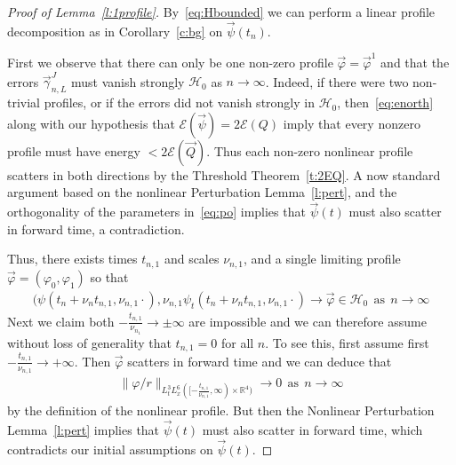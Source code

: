 \documentclass[10pt,reqno]{amsart}
\newcommand{\E}{\mathcal{E}}
\newcommand{\HH}{\mathcal{H}}
\newcommand{\R}{\mathbb{R}}
\newcommand{\fy}{\varphi}
\newcommand{\EQ}[1]{\begin{equation}\begin{split} #1 \end{split}\end{equation}}
\numberwithin{equation}{section}
\theoremstyle{remark}
\newcommand{\mas}{{\ \ \text{as} \ \ }}
\newcommand{\0}{\emptyset}
\begin{document}
\begin{proof}[Proof of Lemma~\ref{l:1profile}]
By~\eqref{eq:Hbounded} we can perform a linear profile decomposition as in Corollary~\ref{c:bg} on $\vec \psi(t_n)$. 

First we observe that there can only be one non-zero profile $\vec \fy = \vec\fy^1$ and that the errors $\vec \gamma_{n, L}^J$ must vanish strongly $\HH_0$ as $n \to \infty$. Indeed, if there were two non-trivial profiles, or if the errors did not vanish strongly in $\HH_0$, then~\eqref{eq:enorth} along with our hypothesis that $\E(\vec \psi) = 2 \E(Q)$  imply that every nonzero profile must have energy $< 2\E(\vec Q)$. Thus each non-zero nonlinear profile scatters in both directions by the Threshold Theorem~\ref{t:2EQ}. A now standard argument based on the nonlinear Perturbation Lemma~\ref{l:pert}, and the orthogonality of the parameters in~\eqref{eq:po} implies that $\vec \psi(t)$ must also scatter in forward time, a contradiction. 


Thus,  there exists times $t_{n, 1}$ and scales $\nu_{n, 1}$, and a single limiting profile $\vec \fy = (\fy_0, \fy_1)$ so that 
\EQ{ \label{eq:psim0} 
( \psi( t_n + \nu_n t_{n, 1}, \nu_{n, 1} \cdot ),   \nu_{n, 1}\psi_t( t_n + \nu_n t_{n, 1}, \nu_{n, 1} \cdot  ) \to  \vec \fy \in \HH_0 \mas n \to \infty
}
Next we claim both $-\frac{t_{n, 1}}{\nu_{n_1}} \to \pm \infty$ are impossible and we can therefore assume without loss of generality that $t_{n, 1} = 0$ for all $n$. 
To see this, first assume first   $-\frac{t_{n, 1}}{\nu_{n, 1}} \to +\infty$. Then $\vec \fy$ scatters in forward time and we can deduce that
 \EQ{
\| \fy/ r\|_{L^3_t L^6_x([ -\frac{t_{n, 1}}{ \nu_{n, 1}}, \infty) \times \R^4)} \to 0 \mas n \to \infty
} 
by the definition of the nonlinear profile. But then the Nonlinear Perturbation Lemma~\ref{l:pert} implies that $ \vec \psi(t)$ must also scatter in forward time, which contradicts our initial assumptions on $\vec \psi(t)$. 
 

\end{proof}
\end{document}
